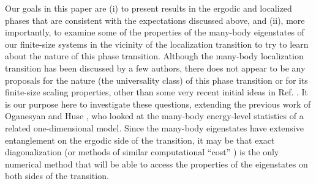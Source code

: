 \documentclass[letterpaper, twocolumn,superscriptaddress, showpacs,preprintnumbers,amsmath,amssymb]{revtex4}
\begin{document}
Our goals in this paper are (i) to present results in the ergodic and localized phases
that are consistent with the expectations discussed above, and (ii), more importantly, to examine some of the
properties of the many-body eigenstates of our finite-size systems in the vicinity of the localization transition to %
try to learn about the nature of this phase transition.  Although the many-body localization transition has been
discussed by a few authors, there does not appear to be any proposals for the nature (the universality class) of this phase
transition or for its finite-size scaling properties, other than some very recent initial ideas in Ref. \cite{mg}.
It is our purpose here to investigate these questions,
extending the previous work of Oganesyan and Huse \cite{OHED}, who looked at the
many-body energy-level statistics of a related one-dimensional model.
Since the many-body eigenstates have extensive entanglement on the ergodic side of the transition, it may be that
exact diagonalization (or methods of similar computational ``cost'' \cite{mg})
is the only numerical method that will be able to access the properties of the eigenstates on both sides
of the transition.




\end{document}
